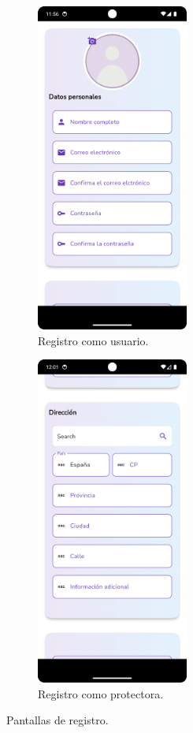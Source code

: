 \documentclass[a4paper, 12pt]{article}
\begin{document}
\begin{figure}[H]
   	\begin{subfigure}{0.48\textwidth}
		\begin{center}
			{\includegraphics[width=5cm]{app/RegisterUserEmpty.png}\par}
			\caption{Registro como usuario.}
		\end{center}  
	\end{subfigure}\hfill
   	\begin{subfigure}{0.48\textwidth}
		\begin{center}
			{\includegraphics[width=5cm]{app/RegisterCompanyAddress.png}\par}
			\caption{Registro como protectora.}
		\end{center}  
	\end{subfigure}\hfill
	\caption{Pantallas de registro.}
\end{figure}
\end{document}
